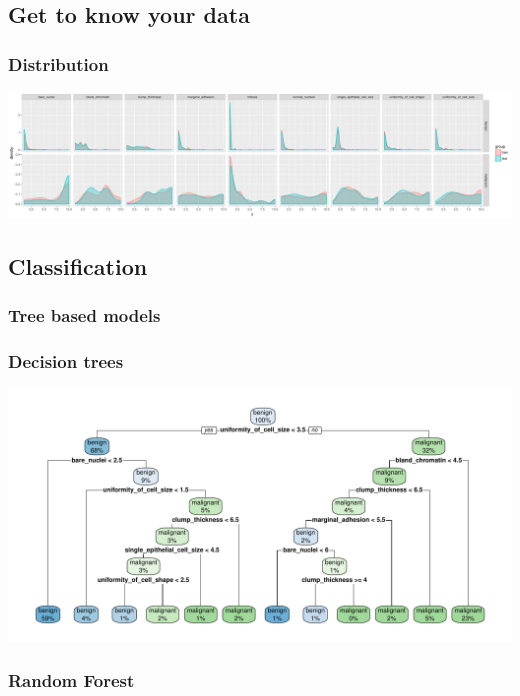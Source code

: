 \documentclass[notes, c, 11pt, xcolor=svgnames, hyperref={colorlinks,citecolor=DeepPink4,linkcolor=DarkRed,urlcolor=DarkBlue}]{beamer}
\begin{document}
\subsection{Get to know your data}

\begin{frame}
	\frametitle{Distribution}
	
	\begin{center}\includegraphics[width=1\textwidth]{webinar_code_files/figure-latex/unnamed-chunk-6-1} \end{center}
\end{frame}


\subsection{Classification}

\subsubsection{Tree based models}

\begin{frame}
	\frametitle{Decision trees}
	
	\begin{center}\includegraphics[width=1\textwidth]{webinar_code_files/figure-latex/unnamed-chunk-12-1} \end{center}
	
\end{frame}

\begin{frame}
	\frametitle{Random Forest}
	
	
\end{frame}
\end{document}
